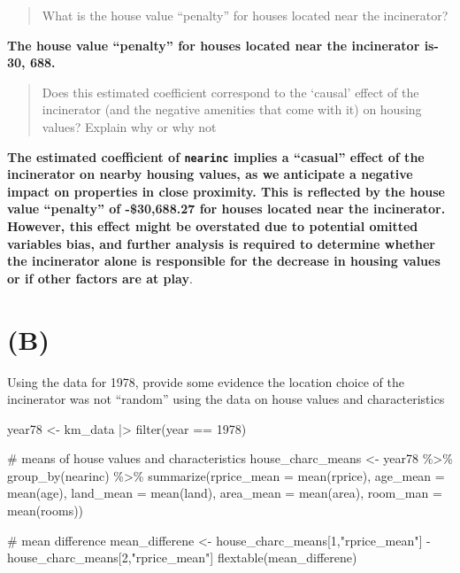 \documentclass[
  letterpaper,
  DIV=11,
  numbers=noendperiod]{scrartcl}
\newenvironment{Shaded}{\begin{snugshade}}{\end{snugshade}}
\newcommand{\AttributeTok}[1]{\textcolor[rgb]{0.40,0.45,0.13}{#1}}
\newcommand{\CommentTok}[1]{\textcolor[rgb]{0.37,0.37,0.37}{#1}}
\newcommand{\DecValTok}[1]{\textcolor[rgb]{0.68,0.00,0.00}{#1}}
\newcommand{\FunctionTok}[1]{\textcolor[rgb]{0.28,0.35,0.67}{#1}}
\newcommand{\NormalTok}[1]{\textcolor[rgb]{0.00,0.23,0.31}{#1}}
\newcommand{\OtherTok}[1]{\textcolor[rgb]{0.00,0.23,0.31}{#1}}
\newcommand{\SpecialCharTok}[1]{\textcolor[rgb]{0.37,0.37,0.37}{#1}}
\newcommand{\StringTok}[1]{\textcolor[rgb]{0.13,0.47,0.30}{#1}}
\begin{document}
\begin{quote}
What is the house value ``penalty'' for houses located near the
incinerator?
\end{quote}

\textbf{The house value ``penalty'' for houses located near the
incinerator is-30, 688.}

\begin{quote}
Does this estimated coefficient correspond to the `causal' effect of the
incinerator (and the negative amenities that come with it) on housing
values? Explain why or why not
\end{quote}

\textbf{The estimated coefficient of \texttt{nearinc} implies a
``casual'' effect of the incinerator on nearby housing values, as we
anticipate a negative impact on properties in close proximity. This is
reflected by the house value ``penalty'' of -\$30,688.27 for houses
located near the incinerator. However, this effect might be overstated
due to potential omitted variables bias, and further analysis is
required to determine whether the incinerator alone is responsible for
the decrease in housing values or if other factors are at play}.

\hypertarget{b}{%
\section{(B)}\label{b}}

Using the data for 1978, provide some evidence the location choice of
the incinerator was not ``random'' using the data on house values and
characteristics

\begin{Shaded}
\begin{Highlighting}[]
\NormalTok{year78 }\OtherTok{\textless{}{-}}\NormalTok{ km\_data }\SpecialCharTok{|\textgreater{}}
  \FunctionTok{filter}\NormalTok{(year }\SpecialCharTok{==} \DecValTok{1978}\NormalTok{) }

\CommentTok{\#  means of house values and characteristics }
\NormalTok{house\_charc\_means }\OtherTok{\textless{}{-}}\NormalTok{ year78 }\SpecialCharTok{\%\textgreater{}\%}
  \FunctionTok{group\_by}\NormalTok{(nearinc) }\SpecialCharTok{\%\textgreater{}\%}
  \FunctionTok{summarize}\NormalTok{(}\AttributeTok{rprice\_mean =} \FunctionTok{mean}\NormalTok{(rprice),}
            \AttributeTok{age\_mean =} \FunctionTok{mean}\NormalTok{(age),}
            \AttributeTok{land\_mean =} \FunctionTok{mean}\NormalTok{(land),}
            \AttributeTok{area\_mean =} \FunctionTok{mean}\NormalTok{(area),}
            \AttributeTok{room\_man =} \FunctionTok{mean}\NormalTok{(rooms))}

\CommentTok{\# mean difference }
\NormalTok{mean\_differene }\OtherTok{\textless{}{-}}\NormalTok{ house\_charc\_means[}\DecValTok{1}\NormalTok{,}\StringTok{"rprice\_mean"}\NormalTok{] }\SpecialCharTok{{-}}\NormalTok{ house\_charc\_means[}\DecValTok{2}\NormalTok{,}\StringTok{"rprice\_mean"}\NormalTok{]}
\FunctionTok{flextable}\NormalTok{(mean\_differene)}
\end{Highlighting}
\end{Shaded}
\end{document}
